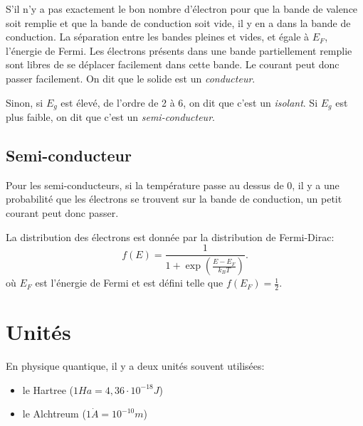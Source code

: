S'il n'y a pas exactement le bon nombre d'électron pour
que la bande de valence soit remplie et que la bande de conduction soit
vide, il y en a dans la bande de conduction.
La séparation entre les bandes pleines et vides, et égale à $E_F$,
l'énergie de Fermi.
Les électrons présents dans une bande partiellement remplie sont libres de se
déplacer facilement dans cette bande. Le courant peut donc passer facilement.
On dit que le solide est un \emph{conducteur}.

Sinon, si $E_g$ est élevé, de l'ordre de 2 à \si{6}{\electronvolt},
on dit que c'est un \emph{isolant}.
Si $E_g$ est plus faible, on dit que c'est un \emph{semi-conducteur}.

\subsection{Semi-conducteur}
Pour les semi-conducteurs,
si la température passe au dessus de \si{0}{\kelvin},
il y a une probabilité que les électrons
se trouvent sur la bande de conduction,
un petit courant peut donc passer.

La distribution des électrons est donnée par la distribution de Fermi-Dirac:
\[ f(E) = \frac{1}{1+\exp\left(\frac{E-E_F}{k_BT}\right)}. \]
où $E_F$ est l'énergie de Fermi et est défini telle que
$f(E_F) = \frac{1}{2}$.

\appendix
\section{Unités}
En physique quantique, il y a deux unités souvent utilisées:
\begin{itemize}
\item le Hartree ($1Ha =  4,36\cdot 10^{-18} J$)
\item le Alchtreum ($1 \dot{A} = 10^{-10} m$)
\end{itemize}

